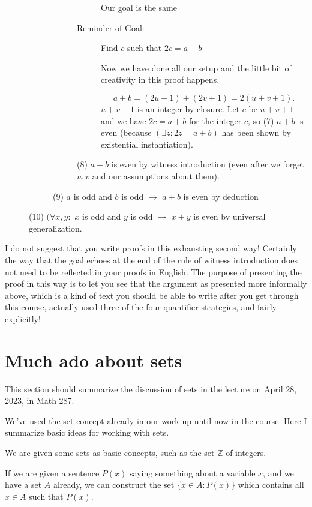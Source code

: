 \documentclass[12pt]{article}
\begin{document}
\begin{description}
\begin{description}
\begin{description}
\begin{description}
Our goal is the same

\item[Reminder of Goal:]  Find $c$ such that $2c=a+b$

Now we have done all our setup and the little bit of creativity in this proof happens.

$$a+b = (2u+1) + (2v+1) = 2(u+v+1).$$  $u+v+1$ is an integer by closure.  Let $c$ be $u+v+1$ and we have
$2c=a+b$ for the integer $c$, so (7) $a+b$ is even (because $(\exists z:2z=a+b)$ has been shown by existential instantiation).

\end{description}
(8) $a+b$ is even by witness introduction (even after we forget $u,v$ and our assumptions about them).
\end{description}
(9)  $a$ is odd and $b$ is odd $\rightarrow$  $a+b$ is even by deduction
\end{description}
(10) $(\forall x,y:$ $x$ is odd and $y$ is odd $\rightarrow$ $x+y$ is even by universal generalization.

\end{description}

I do not suggest that you write proofs in this exhausting second way!  Certainly the way that the goal echoes at the end of the rule of witness introduction does not need to be reflected in your proofs in English.  The purpose of presenting the proof in this way is to let you see that the argument as presented more informally above, which is a kind of text you should be able to write after you get through this course, actually used three of the four quantifier strategies, and fairly explicitly!

\section{Much ado about sets}

This section should summarize the discussion of sets in the lecture on April 28, 2023, in Math 287.

We've used the set concept already in our work up until now in the course.  Here I summarize basic ideas for working with sets.

We are given some sets as basic concepts, such as the set $\mathbb Z$ of integers.

If we are given a sentence $P(x)$ saying something about a variable $x$, and we have a set $A$ already,
we can construct the set $\{x \in A: P(x)\}$ which contains all $x \in A$ such that $P(x)$.
\end{document}
